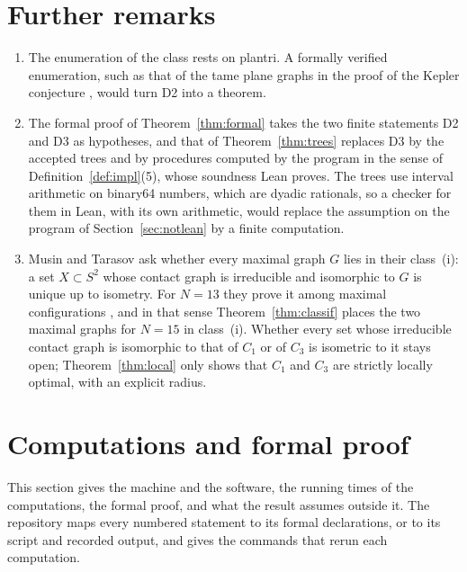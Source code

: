 \documentclass[12pt]{amsart}
\theoremstyle{definition}
\theoremstyle{plain}
\theoremstyle{definition}
\newcommand{\Sph}{S^2}
\newcommand{\CI}{C_1}
\newcommand{\CIII}{C_3}
\begin{document}
\section{Further remarks}\label{sec:remarks}

\begin{enumerate}
\item The enumeration of the class rests on plantri. A formally verified enumeration, such as that of the tame plane graphs in the proof of the Kepler conjecture \cite{NBS}, would turn D2 into a theorem.
\item The formal proof of Theorem~\ref{thm:formal} takes the two finite statements D2 and D3 as hypotheses, and that of Theorem~\ref{thm:trees} replaces D3 by the accepted trees and by procedures computed by the program in the sense of Definition~\ref{def:impl}(5), whose soundness Lean proves. The trees use interval arithmetic on binary64 numbers, which are dyadic rationals, so a checker for them in Lean, with its own arithmetic, would replace the assumption on the program of Section~\ref{sec:notlean} by a finite computation.
\item Musin and Tarasov \cite[Section~6, Question~1]{MTsurvey} ask whether every maximal graph $G$ lies in their class~(i): a set $X\subset\Sph$ whose contact graph is irreducible and isomorphic to $G$ is unique up to isometry. For $N=13$ they prove it among maximal configurations \cite[proof of Lemma~2]{MT13}, and in that sense Theorem~\ref{thm:classif} places the two maximal graphs for $N=15$ in class~(i). Whether every set whose irreducible contact graph is isomorphic to that of $\CI$ or of $\CIII$ is isometric to it stays open; Theorem~\ref{thm:local} only shows that $\CI$ and $\CIII$ are strictly locally optimal, with an explicit radius.
\end{enumerate}

\section{Computations and formal proof}\label{sec:checks}

This section gives the machine and the software, the running times of the computations, the formal proof, and what the result assumes outside it. The repository \cite{Rep} maps every numbered statement to its formal declarations, or to its script and recorded output, and gives the commands that rerun each computation.
\end{document}
